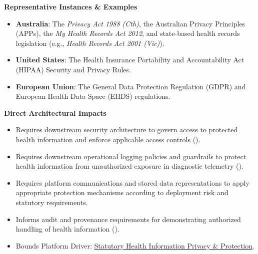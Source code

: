 \par\medskip\textbf{Representative Instances \& Examples}\par


\begin{itemize}


\item \textbf{Australia}: The \emph{Privacy Act 1988 (Cth)}, the Australian Privacy Principles (APPs), the \emph{My Health Records Act 2012}, and state-based health records legislation (e.g., \emph{Health Records Act 2001 (Vic)}).

\item \textbf{United States}: The Health Insurance Portability and Accountability Act (HIPAA) Security and Privacy Rules.

\item \textbf{European Union}: The General Data Protection Regulation (GDPR) and European Health Data Space (EHDS) regulations.

\end{itemize}


\par\medskip\textbf{Direct Architectural Impacts}\par


\begin{itemize}


\item Requires downstream security architecture to govern access to protected health information and enforce applicable access controls (\href{\detokenize{../../../../../../../../docs/markdown/01-motivation/requirements-constraints/master-requirements-catalogue.md}}{\texttt{}}).

\item Requires downstream operational logging policies and guardrails to protect health information from unauthorized exposure in diagnostic telemetry (\href{\detokenize{../../../../../../../../docs/markdown/01-motivation/requirements-constraints/master-requirements-catalogue.md}}{\texttt{}}).

\item Requires platform communications and stored data representations to apply appropriate protection mechanisms according to deployment risk and statutory requirements.

\item Informs audit and provenance requirements for demonstrating authorized handling of health information (\href{\detokenize{../../../../../../../../docs/markdown/01-motivation/requirements-constraints/master-requirements-catalogue.md}}{\texttt{}}).

\item Bounds Platform Driver: \href{\detokenize{../../../../../../../../docs/markdown/01-motivation/drivers-assessments/drivers.md}}{Statutory Health Information Privacy \& Protection}.

\end{itemize}

